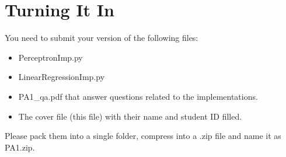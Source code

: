 \documentclass{article}
\theoremstyle{definition}
\begin{document}
\section{Turning It In}
You need to submit your version of the following files:
\begin{itemize}
	\item PerceptronImp.py
	\item LinearRegressionImp.py
	\item PA1\_qa.pdf that answer questions related to the implementations.
	\item The cover file (this file) with their name and student ID filled.
\end{itemize}
Please pack them into a single folder, compress into a .zip file and name it as PA1.zip.
\end{document}
